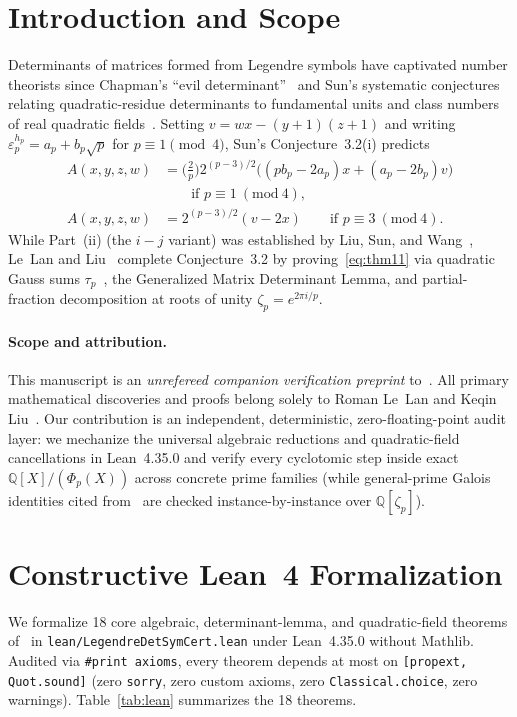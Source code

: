 \documentclass[10pt,twocolumn]{article}
\begin{document}
\section{Introduction and Scope}
Determinants of matrices formed from Legendre symbols have captivated number theorists since Chapman's ``evil determinant''~\cite{Chapman2004,Vsemirnov2012} and Sun's systematic conjectures relating quadratic-residue determinants to fundamental units and class numbers of real quadratic fields~\cite{Sun2019FiniteFields,WangWu2022,Sun2024Conj}. Setting $v = wx - (y+1)(z+1)$ and writing $\varepsilon_p^{h_p} = a_p + b_p\sqrt{p}$ for $p\equiv 1\pmod 4$, Sun's Conjecture~3.2(i) predicts
\begin{equation}
\label{eq:thm11}
\begin{aligned}
A(x,y,z,w) &= \bigl(\tfrac{2}{p}\bigr) 2^{(p-3)/2}\bigl((pb_p - 2a_p)x + (a_p - 2b_p)v\bigr) \\
&\qquad\text{if } p\equiv 1\ (\mathrm{mod}\ 4), \\
A(x,y,z,w) &= 2^{(p-3)/2}(v - 2x) \qquad\text{if } p\equiv 3\ (\mathrm{mod}\ 4).
\end{aligned}
\end{equation}
While Part~(ii) (the $i-j$ variant) was established by Liu, Sun, and Wang~\cite{LiuSunWang2027}, Le~Lan and Liu~\cite{LeLanLiu2026} complete Conjecture~3.2 by proving~\eqref{eq:thm11} via quadratic Gauss sums $\tau_p$~\cite{IwaniecKowalski2004}, the Generalized Matrix Determinant Lemma, and partial-fraction decomposition at roots of unity $\zeta_p = e^{2\pi i/p}$.

\paragraph{Scope and attribution.}
This manuscript is an \emph{unrefereed companion verification preprint} to~\cite{LeLanLiu2026}. All primary mathematical discoveries and proofs belong solely to Roman Le~Lan and Keqin Liu~\cite{LeLanLiu2026}. Our contribution is an independent, deterministic, zero-floating-point audit layer: we mechanize the universal algebraic reductions and quadratic-field cancellations in Lean~4.35.0 and verify every cyclotomic step inside exact $\mathbb{Q}[X]/(\Phi_p(X))$ across concrete prime families (while general-prime Galois identities cited from~\cite{Sun2019FiniteFields} are checked instance-by-instance over $\mathbb{Q}[\zeta_p]$).

\section{Constructive Lean~4 Formalization}
We formalize 18 core algebraic, determinant-lemma, and quadratic-field theorems of~\cite{LeLanLiu2026} in \nolinkurl{lean/LegendreDetSymCert.lean} under Lean~4.35.0 without Mathlib. Audited via \texttt{\#print axioms}, every theorem depends at most on \texttt{[propext, Quot.sound]} (zero \texttt{sorry}, zero custom axioms, zero \texttt{Classical.choice}, zero warnings). Table~\ref{tab:lean} summarizes the 18 theorems.
\end{document}

